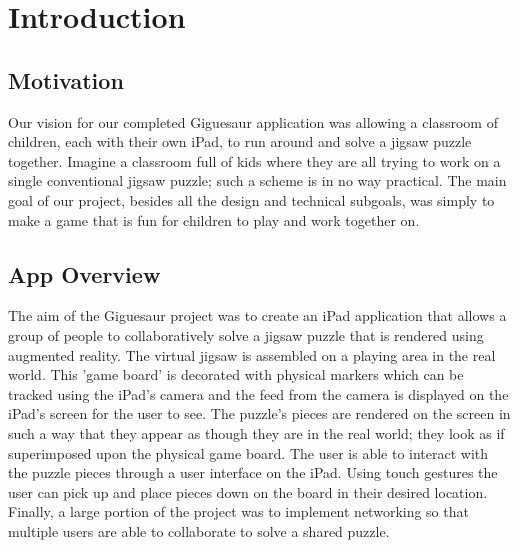 \documentclass{article}
\begin{document}
\section{Introduction}


\subsection{Motivation}

Our vision for our completed Giguesaur application was allowing a classroom of children, each with their own iPad, to run around and solve a jigsaw puzzle together. Imagine a classroom full of kids where they are all trying to work on a single conventional jigsaw puzzle; such a scheme is in no way practical. The main goal of our project, besides all the design and technical subgoals, was simply to make a game that is fun for children to play and work together on. 

\subsection{App Overview}

The aim of the Giguesaur project was to create an iPad application that allows a group of people to collaboratively solve a jigsaw puzzle that is rendered using augmented reality. The virtual jigsaw is assembled on a playing area in the real world. This 'game board' is decorated with physical markers which can be tracked using the iPad's camera and the feed from the camera is displayed on the iPad's screen for the user to see. The puzzle's pieces are rendered on the screen in such a way that they appear as though they are in the real world; they look as if superimposed upon the physical game board. The user is able to interact with the puzzle pieces through a user interface on the iPad. Using touch gestures the user can pick up and place pieces down on the board in their desired location. Finally, a large portion of the project was to implement networking so that multiple users are able to collaborate to solve a shared puzzle. 
\end{document}
